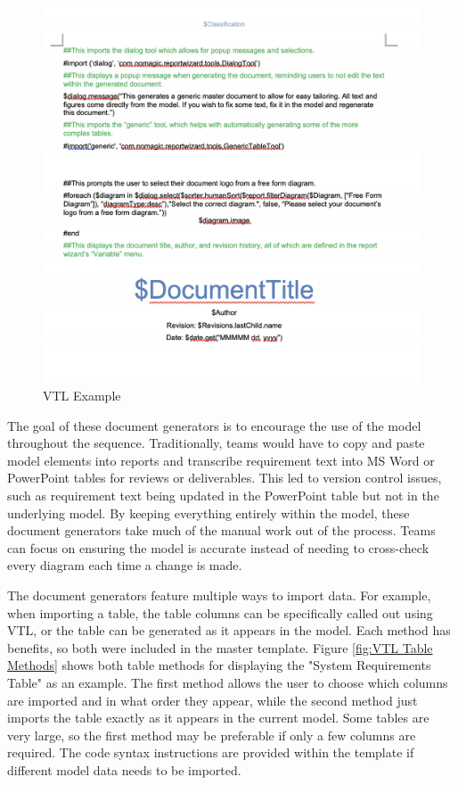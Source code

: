 \documentclass[conference]{joss-pretty}
\begin{document}
\begin{figure}
    \centering
    \includegraphics[width=\textwidth]{Figures/VTL example.png}
    \caption{VTL Example}
    \label{fig:VTL Example}
\end{figure}

The goal of these document generators is to encourage the use of the model throughout the sequence. Traditionally, teams would have to copy and paste model elements into reports and transcribe requirement text into MS Word or PowerPoint tables for reviews or deliverables. This led to version control issues, such as requirement text being updated in the PowerPoint table but not in the underlying model. By keeping everything entirely within the model, these document generators take much of the manual work out of the process. Teams can focus on ensuring the model is accurate instead of needing to cross-check every diagram each time a change is made.

The document generators feature multiple ways to import data. For example, when importing a table, the table columns can be specifically called out using VTL, or the table can be generated as it appears in the model. Each method has benefits, so both were included in the master template. Figure \ref{fig:VTL Table Methods} shows both table methods for displaying the "System Requirements Table" as an example. The first method allows the user to choose which columns are imported and in what order they appear, while the second method just imports the table exactly as it appears in the current model. Some tables are very large, so the first method may be preferable if only a few columns are required. The code syntax instructions are provided within the template if different model data needs to be imported. 
\end{document}
